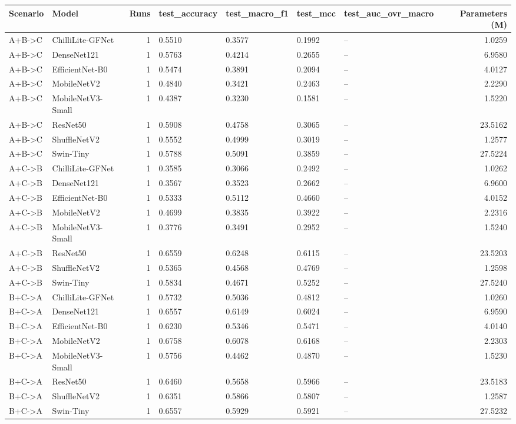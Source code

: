 \begin{tabular}{llrllllr}
\toprule
Scenario & Model & Runs & test\_accuracy & test\_macro\_f1 & test\_mcc & test\_auc\_ovr\_macro & Parameters (M) \\
\midrule
A+B->C & ChilliLite-GFNet & 1 & 0.5510 & 0.3577 & 0.1992 & -- & 1.0259 \\
A+B->C & DenseNet121 & 1 & 0.5763 & 0.4214 & 0.2655 & -- & 6.9580 \\
A+B->C & EfficientNet-B0 & 1 & 0.5474 & 0.3891 & 0.2094 & -- & 4.0127 \\
A+B->C & MobileNetV2 & 1 & 0.4840 & 0.3421 & 0.2463 & -- & 2.2290 \\
A+B->C & MobileNetV3-Small & 1 & 0.4387 & 0.3230 & 0.1581 & -- & 1.5220 \\
A+B->C & ResNet50 & 1 & 0.5908 & 0.4758 & 0.3065 & -- & 23.5162 \\
A+B->C & ShuffleNetV2 & 1 & 0.5552 & 0.4999 & 0.3019 & -- & 1.2577 \\
A+B->C & Swin-Tiny & 1 & 0.5788 & 0.5091 & 0.3859 & -- & 27.5224 \\
A+C->B & ChilliLite-GFNet & 1 & 0.3585 & 0.3066 & 0.2492 & -- & 1.0262 \\
A+C->B & DenseNet121 & 1 & 0.3567 & 0.3523 & 0.2662 & -- & 6.9600 \\
A+C->B & EfficientNet-B0 & 1 & 0.5333 & 0.5112 & 0.4660 & -- & 4.0152 \\
A+C->B & MobileNetV2 & 1 & 0.4699 & 0.3835 & 0.3922 & -- & 2.2316 \\
A+C->B & MobileNetV3-Small & 1 & 0.3776 & 0.3491 & 0.2952 & -- & 1.5240 \\
A+C->B & ResNet50 & 1 & 0.6559 & 0.6248 & 0.6115 & -- & 23.5203 \\
A+C->B & ShuffleNetV2 & 1 & 0.5365 & 0.4568 & 0.4769 & -- & 1.2598 \\
A+C->B & Swin-Tiny & 1 & 0.5834 & 0.4671 & 0.5252 & -- & 27.5240 \\
B+C->A & ChilliLite-GFNet & 1 & 0.5732 & 0.5036 & 0.4812 & -- & 1.0260 \\
B+C->A & DenseNet121 & 1 & 0.6557 & 0.6149 & 0.6024 & -- & 6.9590 \\
B+C->A & EfficientNet-B0 & 1 & 0.6230 & 0.5346 & 0.5471 & -- & 4.0140 \\
B+C->A & MobileNetV2 & 1 & 0.6758 & 0.6078 & 0.6168 & -- & 2.2303 \\
B+C->A & MobileNetV3-Small & 1 & 0.5756 & 0.4462 & 0.4870 & -- & 1.5230 \\
B+C->A & ResNet50 & 1 & 0.6460 & 0.5658 & 0.5966 & -- & 23.5183 \\
B+C->A & ShuffleNetV2 & 1 & 0.6351 & 0.5866 & 0.5807 & -- & 1.2587 \\
B+C->A & Swin-Tiny & 1 & 0.6557 & 0.5929 & 0.5921 & -- & 27.5232 \\
\bottomrule
\end{tabular}
